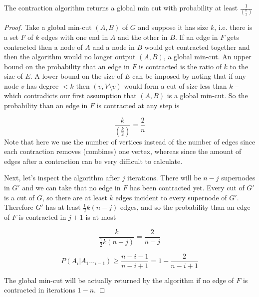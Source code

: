 \documentclass[../notes.tex]{subfiles}
\begin{document}
\begin{lemma}
  The contraction algorithm returns a global min cut with probability at least $ \frac{1}{\binom{n}{2}} $
  \begin{proof}
    Take a global min-cut $ (A, B) $ of $ G $ and suppose it has size $ k $, i.e. there is a set $ F $ of $ k $ edges with one end in $ A $ and the other in $ B $.
    If an edge in $ F $ gets contracted then a node of $ A$ and a node in $ B $ would get contracted together and then the algorithm would no longer output $ (A, B) $, a global min-cut.
    An upper bound on the probability that an edge in $ F $ is contracted is the ratio of $ k $ to the size of $ E $. A lower bound on the size of $ E $ can be imposed by noting that if any node $ v $ has degree $ < k $ then $ ({v}, V\setminus {v}) $ would form a cut of size less than $ k $ -- which contradicts our first assumption that $ (A,B) $ is a global min-cut.
    So the probability than an edge in $ F $ is contracted at any step is

    \begin{equation}
      \frac{k}{(\frac{k}{2})} = \frac{2}{n}
    \end{equation}
    Note that here we use the number of vertices instead of the number of edges since each contraction removes (combines) one vertex, whereas since the amount of edges after a contraction can be very difficult to calculate.

    Next, let's inspect the algorithm after $ j $ iterations. 
    There will be $ n-j $ supernodes in $ G' $ and we can take that no edge in $ F $ has been contracted yet. 
    Every cut of $ G' $ is a cut of $ G $, so there are at least $ k $ edges incident to every supernode of $ G' $. Therefore $ G' $ has at least $ \frac{1}{2}k(n-j) $ edges, and so the probability than an edge of $ F $ is contracted in $ j+1 $ is at most

    \begin{equation}
      \frac{k}{\frac{1}{2}k(n-j)} = \frac{2}{n-j}
    \end{equation}


  \begin{equation}
    P(A_i | A_1\ldots_{i-1}) \ge \frac{n-i-1}{n-i+1} = 1 - \frac{2}{n-i+1}
  \end{equation}


  The global min-cut will be actually returned by the algorithm if no edge of $ F $ is contracted in iterations $  1 - n $.


\end{proof}
\end{lemma}
\end{document}
